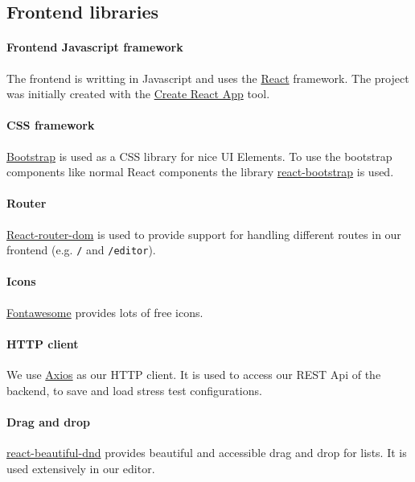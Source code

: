 \subsection{Frontend libraries}

\paragraph{Frontend Javascript framework}
The frontend is writting in Javascript and uses the \href{https://reactjs.org}{React} framework.
The project was initially created with the \href{https://create-react-app.dev}{Create React App} tool.

\paragraph{CSS framework}
\href{https://getbootstrap.com}{Bootstrap} is used as a CSS library for nice UI Elements. 
To use the bootstrap components like normal React components the library \href{https://react-bootstrap.github.io}{react-bootstrap} is used.

\paragraph{Router}
\href{https://reacttraining.com/react-router/web/guides/quick-start}{React-router-dom} is used to provide support for handling different routes in our frontend (e.g. \texttt{/} and \texttt{/editor}).

\paragraph{Icons}
\href{https://fontawesome.com}{Fontawesome} provides lots of free icons.

\paragraph{HTTP client}
We use \href{https://github.com/axios/axios}{Axios} as our HTTP client.
It is used to access our REST Api of the backend, to save and load stress test configurations.

\paragraph{Drag and drop}
\href{https://github.com/atlassian/react-beautiful-dnd}{react-beautiful-dnd} provides beautiful and accessible drag and drop for lists.
It is used extensively in our editor.

